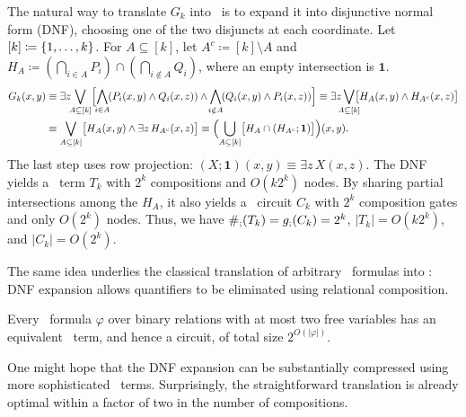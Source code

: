The natural way to translate $G_k$ into \CoR\ is to expand it into disjunctive normal form (DNF),
choosing one of the two disjuncts at each coordinate.
Let $[k]\coloneqq\{ 1,\ldots,k \}$.
For $A\subseteq[k]$, let $A^c \coloneqq [k]\setminus A$ and
$H_A \coloneqq (\bigcap_{i\in A}P_i)\cap(\bigcap_{i\notin A}Q_i)$,
where an empty intersection is $\mathbf{1}$.
\begin{align*}
G_k(x,y)
&\equiv \exists z\!\!\bigvee_{A\subseteq[k]}
\Bigl[
\bigwedge_{\mathclap{i\in A}}(P_i(x,y)\land Q_i(x,z))
\land
\bigwedge_{\mathclap{i\notin A}}(Q_i(x,y)\land P_i(x,z))
\Bigr]
\equiv \exists z\bigvee_{\mathclap{A\subseteq[k]}}
\bigl[H_A(x,y)\land H_{A^c}(x,z)\bigr]
\\
&\equiv \bigvee_{A\subseteq[k]}
\bigl[H_A(x,y)\land\exists z\,H_{A^c}(x,z)\bigr]
\equiv \Bigl(\bigcup_{A\subseteq[k]}
\bigl[H_A\cap(H_{A^c};\mathbf{1})\bigr]\Bigr)(x,y).
\end{align*}
The last step uses row projection:
$(X;\mathbf{1})(x,y)\equiv\exists z\,X(x,z)$.
The DNF yields a \CoR\ term $T_k$ with $2^k$ compositions and $O(k2^k)$ nodes. By sharing partial intersections among the $H_A$, it also yields a \CoR\ circuit $C_k$ with $2^k$ composition gates and only $O(2^k)$ nodes.
Thus, we have
$\#_{;}(T_k)=g_{;}(C_k)=2^k$,
$|T_k|=O(k2^k)$, and $|C_k|=O(2^k)$.

The same idea underlies the classical translation of arbitrary \FOthree\ formulas into \CoR: DNF expansion allows quantifiers to be eliminated using relational composition.
\begin{proposition*}
Every \FOthree\ formula $\varphi$ over binary relations with at most two
free variables has an equivalent \CoR\ term, and hence a circuit, of total
size $2^{O(|\varphi|)}$.
\end{proposition*}

\smallskip
{}
One might hope that the DNF expansion can be substantially compressed using more sophisticated \CoR\ terms.
Surprisingly, the straightforward translation is already optimal within a factor of two in the number of compositions.

